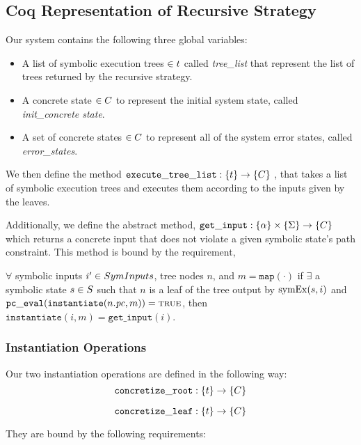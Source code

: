 \subsection{Coq Representation of Recursive Strategy}
Our system contains the following three global variables:
\begin{itemize}
\item A list of symbolic execution trees $\in t$ called \textit{tree\_list} that represent the list of trees returned by the recursive strategy.
\item A concrete state $\in C$ to represent the initial system state, called \textit{init\_concrete state}.
\item A set of concrete states $\in C$ to represent all of the system error states, called \textit{error\_states}.
\end{itemize}

We then define the method $ \mathtt{execute\_tree\_list} : \{t\} \rightarrow \{C\}$ , that takes a list of symbolic execution trees and executes them according to the inputs given by the leaves.

Additionally, we define the abstract method, $ \mathtt{get\_input} : \{\alpha\} \times \{\Sigma\} \rightarrow \{C\}$ which returns a concrete input that does not violate a given symbolic state's path constraint.
This method is bound by the requirement,

\begin{definition}
$ \forall$ symbolic inputs $i' \in SymInputs$, tree nodes $n$, and $m = \mathtt{map(\cdot)}$
if $\exists$ a symbolic state $s \in S$  such that
$n$ is a leaf of the tree output by $\mathrm{symEx}(s, i)$ and 
$\mathtt{pc\_eval} (\mathtt{instantiate} (n.\mathit{pc}, m)) = \mathtt{\textsc{true}}$, then
$\mathtt{instantiate}(i, m) = \mathtt{get\_input}(i)$.
\end{definition}

\subsubsection{Instantiation Operations}

Our two instantiation operations are defined in the following way: 
$$\mathtt{concretize\_root} : \{ t \} \rightarrow \{C\}$$

$$\mathtt{concretize\_leaf} : \{ t \} \rightarrow \{C\}$$

They are bound by the following requirements:

